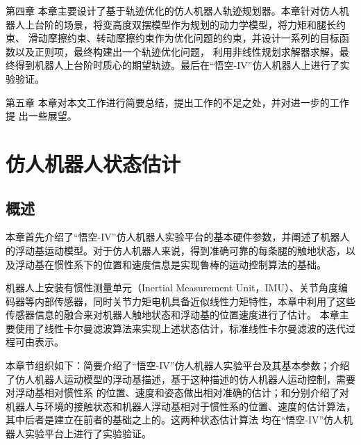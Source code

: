 第四章 本章主要设计了基于轨迹优化的仿人机器人轨迹规划器。本章针对仿人机器人上台阶的场景，将变高度双摆模型作为规划的动力学模型，将力矩和腿长约束、
滑动摩擦约束、转动摩擦约束作为优化问题的约束，并设计一系列的目标函数以及正则项，最终构建出一个轨迹优化问题，
利用非线性规划求解器求解，最终得到机器人上台阶时质心的期望轨迹。最后在“悟空-IV”仿人机器人上进行了实验验证。

第五章 本章对本文工作进行简要总结，提出工作的不足之处，并对进一步的工作提
出一些展望。
\chapter{仿人机器人状态估计}
\section{概述}
本章首先介绍了“悟空-IV”仿人机器人实验平台的基本硬件参数，并阐述了机器人的浮动基运动模型。对于仿人机器人来说，得到准确可靠的每条腿的触地状态，以及浮动基在惯性系下的位置和速度信息是实现鲁棒的运动控制算法的基础。

机器人上安装有惯性测量单元（Inertial Measurement Unit，IMU）、关节角度编码器等内部传感器，同时关节力矩电机具备近似线性力矩特性，本章中利用了这些传感器信息的融合来对机器人触地状态和浮动基的位置速度进行了估计。
本章主要使用了线性卡尔曼滤波算法来实现上述状态估计，标准线性卡尔曼滤波的迭代过程可由表示。

本章节组织如下：简要介绍了“悟空-IV”仿人机器人实验平台及其基本参数；介绍了仿人机器人运动模型的浮动基描述，基于这种描述的仿人机器人运动控制，需要对浮动基相对惯性系
的位置、速度和姿态做出相对准确的估计；和分别介绍了对机器人与环境的接触状态和机器人浮动基相对于惯性系的位置、速度的估计算法，其中后者是建立在前者的基础之上的。这两种状态估计算法
均在“悟空-IV”仿人机器人实验平台上进行了实验验证。
